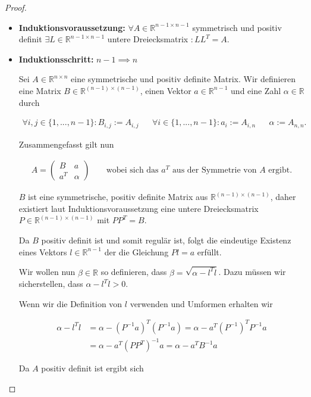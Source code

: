 \documentclass[]{article}
\begin{document}
\begin{proof}
\begin{itemize}
		\item \textbf{Induktionsvoraussetzung:} $\forall A \in \mathbb{R}^{n - 1 \times n - 1}$ symmetrisch und positiv definit $\exists L \in \mathbb{R}^{n - 1\times n - 1}$ untere Dreiecksmatrix $:LL^T=A$.
		
		\item \textbf{Induktionsschritt:} $n-1 \implies n$
		
		Sei $A \in \mathbb{R}^{n\times n}$ eine symmetrische und positiv definite Matrix. Wir definieren eine Matrix $B \in \mathbb{R}^{(n-1)\times(n-1)}$, einen Vektor $a \in \mathbb{R}^{n-1}$ und eine Zahl $\alpha \in \mathbb{R}$ durch
		
		\begin{align*}
			\forall i, j \in \{1, ..., n - 1\}: B_{i,j} := A_{i,j} && \forall i \in \{1, ..., n - 1\}: a_i := A_{i,n} && \alpha := A_{n,n}.
		\end{align*}
		
		Zusammengefasst gilt nun
		
		\begin{align*}
			A = \begin{pmatrix}
				B & a \\
				a^T & \alpha
			\end{pmatrix} && \text{ wobei sich das }a^T\text{ aus der Symmetrie von }A\text{ ergibt.}
		\end{align*}
	
		$B$ ist eine symmetrische, positiv definite Matrix aus $\mathbb{R}^{(n-1)\times(n-1)}$, daher existiert laut Induktionsvoraussetzung eine untere Dreiecksmatrix $P \in \mathbb{R}^{(n-1)\times(n-1)}$ mit $PP^T=B$.
		
		Da $B$ positiv definit ist und somit regulär ist, folgt die eindeutige Existenz eines Vektors $l \in \mathbb{R}^{n-1}$ der die Gleichung $Pl=a$ erfüllt.
		
		Wir wollen nun $\beta \in \mathbb{R}$ so definieren, dass $\beta = \sqrt{\alpha - l^Tl}$. Dazu müssen wir sicherstellen, dass $\alpha - l^Tl > 0$.
		
		Wenn wir die Definition von $l$ verwenden und Umformen erhalten wir
		
		\begin{align*}
			\alpha - l^Tl &= \alpha - (P^{-1}a)^T(P^{-1}a) = \alpha - a^T (P^{-1})^TP^{-1}a \\
			&= \alpha - a^T (PP^T)^{-1}a = \alpha - a^T B^{-1}a
		\end{align*}
	
		Da $A$ positiv definit ist ergibt sich
	

\end{itemize}
\end{proof}
\end{document}
